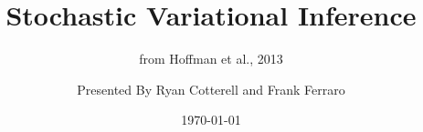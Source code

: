 \documentclass{beamer}
\begin{document}
\title{Stochastic Variational Inference}   
\subtitle{from Hoffman et al., 2013}
\author{Presented By Ryan Cotterell and Frank Ferraro} 
\date{\today} 

\frame{\titlepage} 














 






\end{document}
